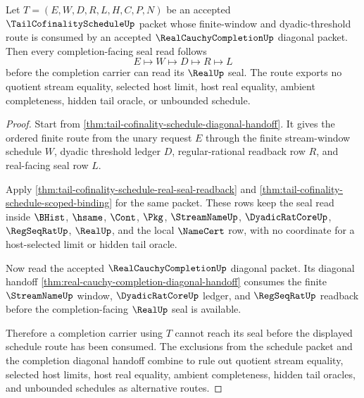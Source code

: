\begin{theorem}
\label{thm:tail-cofinality-schedule-regular-cauchy-completion-route}
Let $T=(E,W,D,R,L,H,C,P,N)$ be an accepted $\TailCofinalityScheduleUp$ packet whose finite-window and dyadic-threshold route is consumed by an accepted $\RealCauchyCompletionUp$ diagonal packet. Then every completion-facing seal read follows
$$
E \longmapsto W \longmapsto D \longmapsto R \longmapsto L
$$
before the completion carrier can read its $\RealUp$ seal. The route exports no quotient stream equality, selected host limit, host real equality, ambient completeness, hidden tail oracle, or unbounded schedule.
\end{theorem}
\begin{proof}
Start from \autoref{thm:tail-cofinality-schedule-diagonal-handoff}. It gives the ordered finite route from the unary request $E$ through the finite stream-window schedule $W$, dyadic threshold ledger $D$, regular-rational readback row $R$, and real-facing seal row $L$.

Apply \autoref{thm:tail-cofinality-schedule-real-seal-readback} and \autoref{thm:tail-cofinality-schedule-scoped-binding} for the same packet. These rows keep the seal read inside $\BHist$, $\hsame$, $\Cont$, $\Pkg$, $\StreamNameUp$, $\DyadicRatCoreUp$, $\RegSeqRatUp$, $\RealUp$, and the local $\NameCert$ row, with no coordinate for a host-selected limit or hidden tail oracle.

Now read the accepted $\RealCauchyCompletionUp$ diagonal packet. Its diagonal handoff \autoref{thm:real-cauchy-completion-diagonal-handoff} consumes the finite $\StreamNameUp$ window, $\DyadicRatCoreUp$ ledger, and $\RegSeqRatUp$ readback before the completion-facing $\RealUp$ seal is available.

Therefore a completion carrier using $T$ cannot reach its seal before the displayed schedule route has been consumed. The exclusions from the schedule packet and the completion diagonal handoff combine to rule out quotient stream equality, selected host limits, host real equality, ambient completeness, hidden tail oracles, and unbounded schedules as alternative routes.
\end{proof}

